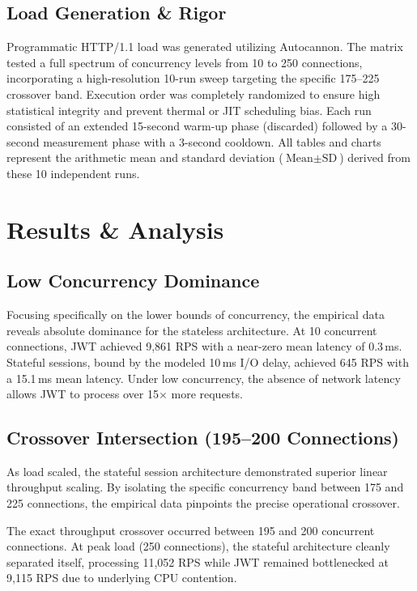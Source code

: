 \documentclass[conference]{IEEEtran}
\begin{document}
\subsection{Load Generation \& Rigor}
Programmatic HTTP/1.1 load was generated utilizing Autocannon. The matrix tested a full spectrum of concurrency levels from 10 to 250 connections, incorporating a high-resolution 10-run sweep targeting the specific 175--225 crossover band. Execution order was completely randomized to ensure high statistical integrity and prevent thermal or JIT scheduling bias. Each run consisted of an extended 15-second warm-up phase (discarded) followed by a 30-second measurement phase with a 3-second cooldown. All tables and charts represent the arithmetic mean and standard deviation ($\text{Mean} \pm \text{SD}$) derived from these 10 independent runs.

\section{Results \& Analysis}

\subsection{Low Concurrency Dominance}
Focusing specifically on the lower bounds of concurrency, the empirical data reveals absolute dominance for the stateless architecture. At 10 concurrent connections, JWT achieved 9,861 RPS with a near-zero mean latency of 0.3\,ms. Stateful sessions, bound by the modeled 10\,ms I/O delay, achieved 645 RPS with a 15.1\,ms mean latency. Under low concurrency, the absence of network latency allows JWT to process over 15$\times$ more requests.

\subsection{Crossover Intersection (195--200 Connections)}
As load scaled, the stateful session architecture demonstrated superior linear throughput scaling. By isolating the specific concurrency band between 175 and 225 connections, the empirical data pinpoints the precise operational crossover.

The exact throughput crossover occurred between 195 and 200 concurrent connections. At peak load (250 connections), the stateful architecture cleanly separated itself, processing 11,052 RPS while JWT remained bottlenecked at 9,115 RPS due to underlying CPU contention.
\end{document}
